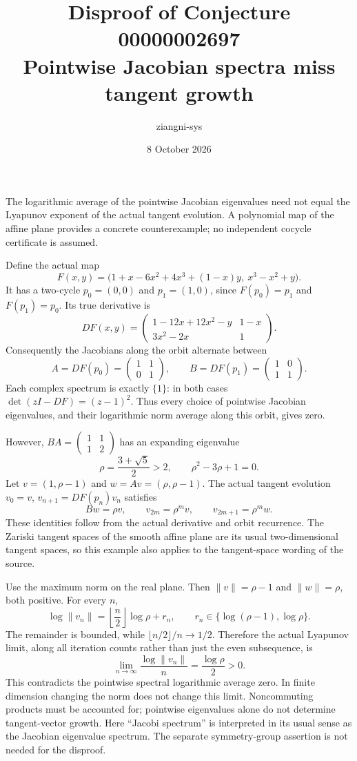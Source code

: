 \documentclass[11pt]{article}
\title{Disproof of Conjecture 00000002697\\Pointwise Jacobian spectra miss tangent growth}
\author{ziangni-sys}
\date{8 October 2026}
\begin{document}
\maketitle
The logarithmic average of the pointwise Jacobian eigenvalues need not equal the Lyapunov exponent of the actual tangent evolution. A polynomial map of the affine plane provides a concrete counterexample; no independent cocycle certificate is assumed.

Define the actual map
\[
 F(x,y)=\bigl(1+x-6x^2+4x^3+(1-x)y,\ x^3-x^2+y\bigr).
\]
It has a two-cycle $p_0=(0,0)$ and $p_1=(1,0)$, since $F(p_0)=p_1$ and $F(p_1)=p_0$. Its true derivative is
\[
 DF(x,y)=\begin{pmatrix}
 1-12x+12x^2-y&1-x\\3x^2-2x&1
 \end{pmatrix}.
\]
Consequently the Jacobians along the orbit alternate between
\[
 A=DF(p_0)=\begin{pmatrix}1&1\\0&1\end{pmatrix},\qquad
 B=DF(p_1)=\begin{pmatrix}1&0\\1&1\end{pmatrix}.
\]
Each complex spectrum is exactly $\{1\}$: in both cases $\det(zI-DF)=(z-1)^2$. Thus every choice of pointwise Jacobian eigenvalues, and their logarithmic norm average along this orbit, gives zero.

However, $BA=\left(\begin{smallmatrix}1&1\\1&2\end{smallmatrix}\right)$ has an expanding eigenvalue
\[
 \rho=\frac{3+\sqrt5}{2}>2,\qquad \rho^2-3\rho+1=0.
\]
Let $v=(1,\rho-1)$ and $w=Av=(\rho,\rho-1)$. The actual tangent evolution $v_0=v$, $v_{n+1}=DF(p_n)v_n$ satisfies
\[
 Bw=\rho v,\qquad v_{2m}=\rho^m v,\qquad v_{2m+1}=\rho^m w.
\]
These identities follow from the actual derivative and orbit recurrence. The Zariski tangent spaces of the smooth affine plane are its usual two-dimensional tangent spaces, so this example also applies to the tangent-space wording of the source.

Use the maximum norm on the real plane. Then $\|v\|=\rho-1$ and $\|w\|=\rho$, both positive. For every $n$,
\[
 \log\|v_n\|=\left\lfloor\frac n2\right\rfloor\log\rho+r_n,
 \qquad r_n\in\{\log(\rho-1),\log\rho\}.
\]
The remainder is bounded, while $\lfloor n/2\rfloor/n\to1/2$. Therefore the actual Lyapunov limit, along all iteration counts rather than just the even subsequence, is
\[
 \lim_{n\to\infty}\frac{\log\|v_n\|}{n}
 =\frac{\log\rho}{2}>0.
\]
This contradicts the pointwise spectral logarithmic average zero. In finite dimension changing the norm does not change this limit. Noncommuting products must be accounted for; pointwise eigenvalues alone do not determine tangent-vector growth. Here ``Jacobi spectrum'' is interpreted in its usual sense as the Jacobian eigenvalue spectrum. The separate symmetry-group assertion is not needed for the disproof.
\end{document}
